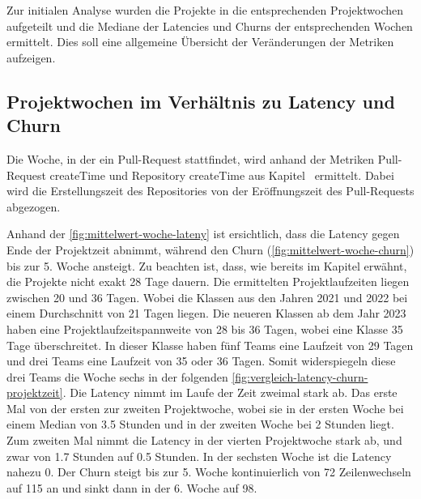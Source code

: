 Zur initialen Analyse wurden die Projekte in die entsprechenden Projektwochen aufgeteilt und die Mediane der Latencies und Churns der entsprechenden Wochen ermittelt. Dies soll eine allgemeine Übersicht der Veränderungen der Metriken aufzeigen.

\subsection{Projektwochen im Verhältnis zu Latency und Churn}
\label{sec:ProjektwochenLatencyChurn}
Die Woche, in der ein Pull-Request stattfindet, wird anhand der Metriken Pull-Request createTime und Repository createTime aus Kapitel~ ermittelt. Dabei wird die Erstellungszeit des Repositories von der Eröffnungszeit des Pull-Requests abgezogen.

Anhand der \autoref{fig:mittelwert-woche-lateny} ist ersichtlich, dass die Latency gegen Ende der Projektzeit abnimmt, während den Churn (\autoref{fig:mittelwert-woche-churn}) bis zur 5. Woche ansteigt. 
Zu beachten ist, dass, wie bereits im Kapitel  erwähnt, die Projekte nicht exakt 28 Tage dauern. Die ermittelten Projektlaufzeiten liegen zwischen 20 und 36 Tagen.
Wobei die Klassen aus den Jahren 2021 und 2022 bei einem Durchschnitt von 21 Tagen liegen. Die neueren Klassen ab dem Jahr 2023 haben eine Projektlaufzeitspannweite von 28 bis 36 Tagen, wobei eine Klasse 35 Tage überschreitet. In dieser Klasse haben fünf Teams eine Laufzeit von 29 Tagen und drei Teams eine Laufzeit von 35 oder 36 Tagen. Somit widerspiegeln diese drei Teams die Woche sechs in der folgenden \autoref{fig:vergleich-latency-churn-projektzeit}. Die Latency nimmt im Laufe der Zeit zweimal stark ab. Das erste Mal von der ersten zur zweiten Projektwoche, wobei sie in der ersten Woche bei einem Median von 3.5 Stunden und in der zweiten Woche bei 2 Stunden liegt. Zum zweiten Mal nimmt die Latency in der vierten Projektwoche stark ab, und zwar von 1.7 Stunden auf 0.5 Stunden. In der sechsten Woche ist die Latency nahezu 0. Der Churn steigt bis zur 5. Woche kontinuierlich von 72 Zeilenwechseln auf 115 an und sinkt dann in der 6. Woche auf 98.
